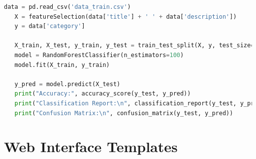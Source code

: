 \documentclass[10pt]{article}
\begin{document}
\begin{itemize}
\begin{lstlisting}[language=Python]
   data = pd.read_csv('data_train.csv')
   X = featureSelection(data['title'] + ' ' + data['description'])
   y = data['category']
   
   X_train, X_test, y_train, y_test = train_test_split(X, y, test_size=0.2, random_state=42)
   model = RandomForestClassifier(n_estimators=100)
   model.fit(X_train, y_train)
   
   y_pred = model.predict(X_test)
   print("Accuracy:", accuracy_score(y_test, y_pred))
   print("Classification Report:\n", classification_report(y_test, y_pred))
   print("Confusion Matrix:\n", confusion_matrix(y_test, y_pred))
   \end{lstlisting}
\end{itemize}

\section{Web Interface Templates}
\end{document}
